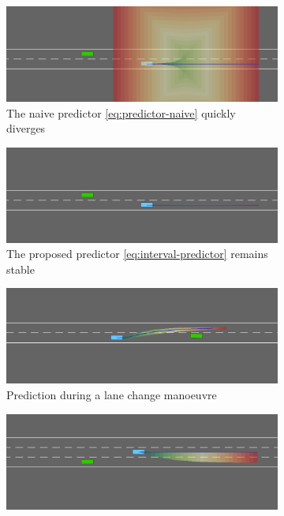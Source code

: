 \begin{figure}
	\begin{center}
	\begin{subfigure}[b]{0.75\linewidth}
		\centering
		\includegraphics[width=\textwidth]{img/driving_observer.png}
		\caption{The naive predictor \eqref{eq:predictor-naive} quickly diverges}
		\label{sub:hw-a}
	\end{subfigure}
	\begin{subfigure}[b]{0.75\linewidth}
		\centering
		\includegraphics[width=\textwidth]{img/driving_predictor.png}
		\caption{The proposed predictor \eqref{eq:interval-predictor} remains stable}
		\label{sub:hw-b}
	\end{subfigure}
	\begin{subfigure}[b]{0.75\linewidth}
		\centering
		\includegraphics[width=\textwidth]{img/lane_change_predictor.png}
		\caption{Prediction during a lane change manoeuvre}
		\label{sub:hw-c}
	\end{subfigure}
	\begin{subfigure}[b]{0.75\linewidth}
		\centering
		\includegraphics[width=\textwidth]{img/overtake.png}

\end{subfigure}
\end{center}
\end{figure}
